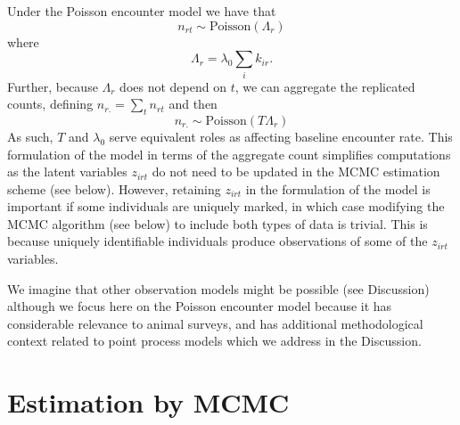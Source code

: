 Under the Poisson encounter model we have that
\begin{equation}
n_{rt} \sim \mbox{Poisson}( \Lambda_{r} )
\label{eq:nagg}
\end{equation}
where
\[
 \Lambda_{r} = \lambda_{0} \sum_{i} k_{ir}.
\]
Further, because $\Lambda_{r}$ does not depend on $t$, we can
aggregate the replicated counts, defining
$n_{r.} = \sum_{t} n_{rt}$ and then
\[
 n_{r.} \sim \mbox{Poisson}( T \Lambda_{r} )
\]
As such, $T$ and $\lambda_{0}$ serve equivalent roles as affecting
baseline encounter rate.
This formulation of the model in terms of the aggregate count
simplifies computations as the latent variables
$z_{irt}$ do not need to be updated in the MCMC estimation
scheme (see below). However, retaining $z_{irt}$
in the formulation of the model
is important if some individuals are uniquely marked, in which case
modifying
the MCMC algorithm (see below) to include both types of data is
trivial. This is because uniquely identifiable individuals produce
observations of some of the $z_{irt}$ variables.

We imagine that other observation models
might be possible (see Discussion) although we focus here on the
Poisson encounter model because it has considerable relevance to
animal surveys, and has additional methodological context related to
point process models which we address in the Discussion.





\section{Estimation by MCMC}
\label{s:mcmc}

